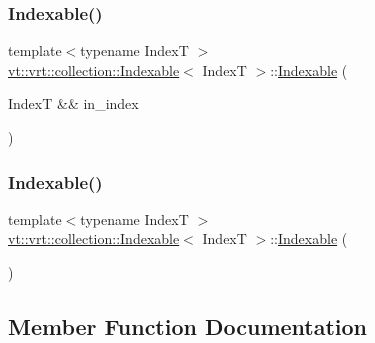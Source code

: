 \subsubsection{\texorpdfstring{Indexable()}{Indexable()}\hspace{0.1cm}{\footnotesize\ttfamily [1/2]}}
{\footnotesize\ttfamily template$<$typename IndexT $>$ \\
\hyperlink{structvt_1_1vrt_1_1collection_1_1_indexable}{vt\+::vrt\+::collection\+::\+Indexable}$<$ IndexT $>$\+::\hyperlink{structvt_1_1vrt_1_1collection_1_1_indexable}{Indexable} (\begin{DoxyParamCaption}\item[{IndexT \&\&}]{in\+\_\+index }\end{DoxyParamCaption})\hspace{0.3cm}{\ttfamily [explicit]}}

\mbox{\label{structvt_1_1vrt_1_1collection_1_1_indexable_a6390131bf531b7128367c51c788305c2}} 
\subsubsection{\texorpdfstring{Indexable()}{Indexable()}\hspace{0.1cm}{\footnotesize\ttfamily [2/2]}}
{\footnotesize\ttfamily template$<$typename IndexT $>$ \\
\hyperlink{structvt_1_1vrt_1_1collection_1_1_indexable}{vt\+::vrt\+::collection\+::\+Indexable}$<$ IndexT $>$\+::\hyperlink{structvt_1_1vrt_1_1collection_1_1_indexable}{Indexable} (\begin{DoxyParamCaption}{ }\end{DoxyParamCaption})\hspace{0.3cm}{\ttfamily [default]}}



\subsection{Member Function Documentation}
\mbox{\label{structvt_1_1vrt_1_1collection_1_1_indexable_a28d05f23e7a20e12e94b8235305c1e82}} 
